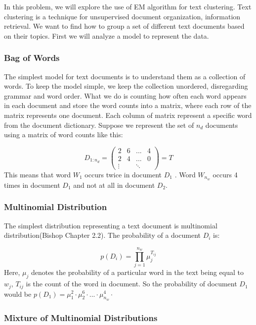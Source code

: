 \documentclass[twoside,10pt]{article}
\begin{document}
In this problem, we will explore the use of EM algorithm for text
clustering. Text clustering is a technique for unsupervised document
organization, information retrieval. We want to find how to group a
set of different text documents based on their topics. First we will
analyze a model to represent the data.

\subsubsection*{Bag of Words}
The simplest model for text documents is to understand them as a
collection of words. To keep the model simple, we keep the
collection unordered, disregarding grammar and word order. What we
do is counting how often each word appears in each document and
store the word counts into a matrix, where each row of the matrix
represents one document. Each column of matrix represent a specific
word from the document dictionary. Suppose we represent the set of
$n_d$ documents using a matrix of word counts like this:

\begin{equation}
D_{1:n_d} =  \begin{pmatrix} 2&6&...&4\\ 2 & 4&...&0\\\vdots&
&\ddots \end{pmatrix} = T\nonumber
\end{equation}
This means that word $W_1$ occurs twice in document $D_1$ . Word
$W_{n_w}$ occurs 4 times in document $D_1$ and not at all in
document $D_2$.

\subsubsection*{Multinomial Distribution}

The simplest distribution representing a text document is
multinomial distribution(Bishop Chapter 2.2). The probability of a
document $D_i$ is:

\begin{equation}
p(D_i) = \prod_{j=1}^{n_w} \mu_j^{T_{ij}}\nonumber
\end{equation}
Here, $\mu_j$ denotes the probability of a particular word in the
text being equal to $w_j$, $T_{ij}$ is the count of the word in
document. So the probability of document $D_1$ would be $p(D_1)=
\mu_1^2\cdot\mu_2^6\cdot...\cdot\mu_{n_w}^4\cdot$

\subsubsection*{Mixture of Multinomial Distributions}
\end{document}
